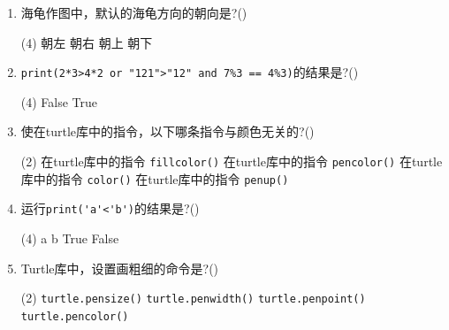 \documentclass[11pt]{ctexart}
\begin{document}
\begin{enumerate}
        \item 海龟作图中，默认的海龟方向的朝向是?(\qquad)
        \begin{tasks}(4)
            \task 朝左
            \task 朝右
            \task 朝上
            \task 朝下
        \end{tasks} 

        \item \lstinline!print(2*3>4*2 or "121">"12" and 7%3 == 4%3)!的结果是?(\qquad)
        \begin{tasks}(4)
            \task False
            \task True
        \end{tasks}

        \item 使在turtle库中的指令，以下哪条指令与颜色无关的?(\qquad)
        \begin{tasks}(2)
            \task 在turtle库中的指令 \lstinline{fillcolor()}
            \task 在turtle库中的指令 \lstinline{pencolor()}
            \task 在turtle库中的指令 \lstinline{color()}
            \task 在turtle库中的指令 \lstinline{penup()}
        \end{tasks}

        \item 运行\lstinline!print('a'<'b')!的结果是?(\qquad)
        \begin{tasks}(4)
            \task a
            \task b
            \task True
            \task False
        \end{tasks}

        \item Turtle库中，设置画粗细的命令是?(\qquad)
        \begin{tasks}(2)
            \task \lstinline{turtle.pensize()}
            \task \lstinline{turtle.penwidth()}
            \task \lstinline{turtle.penpoint()}
            \task \lstinline{turtle.pencolor()}
        \end{tasks}
    \end{enumerate}
\end{document}
